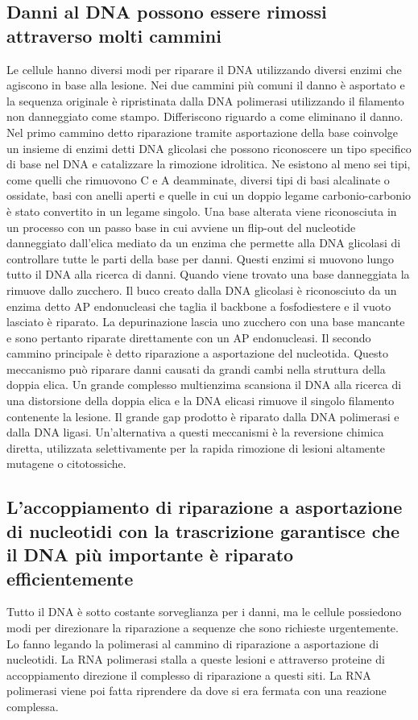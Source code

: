 \subsection{Danni al DNA possono essere rimossi attraverso molti cammini}
Le cellule hanno diversi modi per riparare il DNA utilizzando diversi enzimi che agiscono in base alla lesione. Nei due cammini pi\`u comuni il danno \`e asportato e la sequenza 
originale \`e ripristinata dalla DNA polimerasi utilizzando il filamento non danneggiato come stampo. Differiscono riguardo a come eliminano il danno. Nel primo cammino detto riparazione
tramite asportazione della base coinvolge un insieme di enzimi detti DNA glicolasi che possono riconoscere un tipo specifico di base nel DNA e catalizzare la rimozione idrolitica. Ne
esistono al meno sei tipi, come quelli che rimuovono C e A deamminate, diversi tipi di basi alcalinate o ossidate, basi con anelli aperti e quelle in cui un doppio legame 
carbonio-carbonio \`e stato convertito in un legame singolo. Una base alterata viene riconosciuta in un processo con un passo base in cui avviene un flip-out del nucleotide danneggiato
dall'elica mediato da un enzima che permette alla DNA glicolasi di controllare tutte le parti della base per danni. Questi enzimi si muovono lungo tutto il DNA alla ricerca di danni. 
Quando viene trovato una base danneggiata la rimuove dallo zucchero. Il buco creato dalla DNA glicolasi \`e riconosciuto da un enzima detto AP endonucleasi che taglia il backbone a 
fosfodiestere e il vuoto lasciato \`e riparato. La depurinazione lascia uno zucchero con una base mancante e sono pertanto riparate direttamente con un AP endonucleasi. Il secondo 
cammino principale \`e detto riparazione a asportazione del nucleotida. Questo meccanismo pu\`o riparare danni causati da grandi cambi nella struttura della doppia elica. Un grande
complesso multienzima scansiona il DNA alla ricerca di una distorsione della doppia elica e la DNA elicasi rimuove il singolo filamento contenente la lesione. Il grande gap prodotto \`e
riparato dalla DNA polimerasi e dalla DNA ligasi. Un'alternativa a questi meccanismi \`e la reversione chimica diretta, utilizzata selettivamente per la rapida rimozione di lesioni
altamente mutagene o citotossiche.
\subsection{L'accoppiamento di riparazione a asportazione di nucleotidi con la trascrizione garantisce che il DNA pi\`u importante \`e riparato efficientemente}
Tutto il DNA \`e sotto costante sorveglianza per i danni, ma le cellule possiedono modi per direzionare la riparazione a sequenze che sono richieste urgentemente. Lo fanno legando la
polimerasi al cammino di riparazione a asportazione di nucleotidi. La RNA polimerasi stalla a queste lesioni e attraverso proteine di accoppiamento direzione il complesso di riparazione
a questi siti. La RNA polimerasi viene poi fatta riprendere da dove si era fermata con una reazione complessa.
